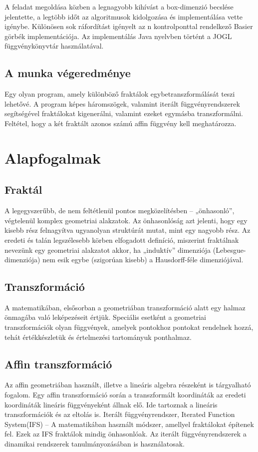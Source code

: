 A feladat megoldása közben a legnagyobb kihívást a box-dimenzió becslése jelentette, a legtöbb időt az algoritmusok kidolgozása és implementálása vette igénybe. Különösen sok ráfordítást igényelt az n kontrolponttal rendelkező Basier görbék implementációja. Az implementálás Java nyelvben történt a JOGL függvénykönyvtár használatával.

\section{A munka végeredménye}
Egy olyan program, amely különböző fraktálok egybetranszformálását teszi lehetővé. A program képes háromszögek, valamint iterált függvényrendszerek segítségével fraktálokat kigenerálni, valamint ezeket egymásba transzformálni. Feltétel, hogy a két fraktált azonos számú affin függvény kell meghatározza.

\chapter{Alapfogalmak}

\section{Fraktál}
A legegyszerűbb, de nem feltétlenül pontos megközelítésben – „önhasonló”, végtelenül komplex geometriai alakzatok. Az önhasonlóság azt jelenti, hogy egy kisebb rész felnagyítva ugyanolyan struktúrát mutat, mint egy nagyobb rész. Az eredeti és talán legszélesebb körben elfogadott definíció, miszerint fraktálnak nevezünk egy geometriai alakzatot akkor, ha „induktív” dimenziója (Lebesgue-dimenziója) nem esik egybe (szigorúan kisebb) a Hausdorff-féle dimenziójával.

\section{Transzformáció}
A matematikában, elsősorban a geometriában transzformáció alatt egy halmaz önmagába való leképezéseit értjük. Speciális esetként a geometriai transzformációk olyan függvények, amelyek pontokhoz pontokat rendelnek hozzá, tehát értékkészletük és értelmezési tartományuk ponthalmaz.

\section{Affin transzformáció}
Az affin geometriában használt, illetve a lineáris algebra részeként is tárgyalható fogalom. Egy affin transzformáció során a transzformált koordináták az eredeti koordináták lineáris függvényeként állnak elő. Ide tartoznak a lineáris transzformációk és az eltolás is.
Iterált függvényrendszer, Iterated Function System(IFS) – A matematikában használt módszer, amellyel fraktálokat építenek fel. Ezek az IFS fraktálok mindig önhasonlóak. Az iterált függvényrendszerek a dinamikai rendszerek tanulmányozásában is használatosak. 

